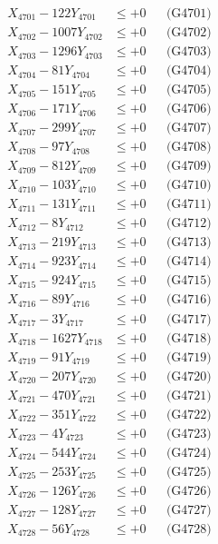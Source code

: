 \documentclass[a4paper,10pt]{article}
\begin{document}
{\begin{align}
\allowbreak
X_{4701} - 122Y_{4701} &\leq +0 && \text{(G4701)} \\
X_{4702} - 1007Y_{4702} &\leq +0 && \text{(G4702)} \\
X_{4703} - 1296Y_{4703} &\leq +0 && \text{(G4703)} \\
X_{4704} - 81Y_{4704} &\leq +0 && \text{(G4704)} \\
X_{4705} - 151Y_{4705} &\leq +0 && \text{(G4705)} \\
X_{4706} - 171Y_{4706} &\leq +0 && \text{(G4706)} \\
X_{4707} - 299Y_{4707} &\leq +0 && \text{(G4707)} \\
X_{4708} - 97Y_{4708} &\leq +0 && \text{(G4708)} \\
X_{4709} - 812Y_{4709} &\leq +0 && \text{(G4709)} \\
X_{4710} - 103Y_{4710} &\leq +0 && \text{(G4710)} \\
\allowbreak
X_{4711} - 131Y_{4711} &\leq +0 && \text{(G4711)} \\
X_{4712} - 8Y_{4712} &\leq +0 && \text{(G4712)} \\
X_{4713} - 219Y_{4713} &\leq +0 && \text{(G4713)} \\
X_{4714} - 923Y_{4714} &\leq +0 && \text{(G4714)} \\
X_{4715} - 924Y_{4715} &\leq +0 && \text{(G4715)} \\
X_{4716} - 89Y_{4716} &\leq +0 && \text{(G4716)} \\
X_{4717} - 3Y_{4717} &\leq +0 && \text{(G4717)} \\
X_{4718} - 1627Y_{4718} &\leq +0 && \text{(G4718)} \\
X_{4719} - 91Y_{4719} &\leq +0 && \text{(G4719)} \\
X_{4720} - 207Y_{4720} &\leq +0 && \text{(G4720)} \\
\allowbreak
X_{4721} - 470Y_{4721} &\leq +0 && \text{(G4721)} \\
X_{4722} - 351Y_{4722} &\leq +0 && \text{(G4722)} \\
X_{4723} - 4Y_{4723} &\leq +0 && \text{(G4723)} \\
X_{4724} - 544Y_{4724} &\leq +0 && \text{(G4724)} \\
X_{4725} - 253Y_{4725} &\leq +0 && \text{(G4725)} \\
X_{4726} - 126Y_{4726} &\leq +0 && \text{(G4726)} \\
X_{4727} - 128Y_{4727} &\leq +0 && \text{(G4727)} \\
X_{4728} - 56Y_{4728} &\leq +0 && \text{(G4728)} \\

\end{align}}
\end{document}

